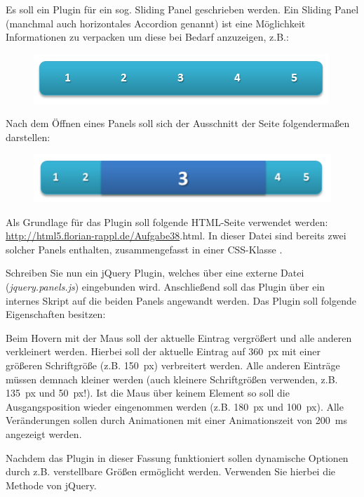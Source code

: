 %
\par Es soll ein Plugin für ein sog. Sliding Panel geschrieben werden. Ein
Sliding Panel (manchmal auch horizontales Accordion genannt) ist eine
Möglichkeit Informationen zu verpacken um diese bei Bedarf anzuzeigen, z.B.:
%
\begin{figure}[!h]
\centering
\includegraphics{Exercises/Figures/pluginclose.png}
\end{figure}
%
\par Nach dem Öffnen eines Panels soll sich der Ausschnitt der Seite
folgendermaßen darstellen:
%
\begin{figure}[!h]
\centering
\includegraphics{Exercises/Figures/pluginopen.png}
\end{figure}
%
\par Als Grundlage für das Plugin soll folgende HTML-Seite verwendet werden:
\url{http://html5.florian-rappl.de/Aufgabe38}.html. In dieser Datei sind
bereits zwei solcher Panels enthalten, zusammengefasst in einer CSS-Klasse
.
%
\par Schreiben Sie nun ein jQuery Plugin, welches über eine externe Datei
(\emph{jquery.panels.js}) eingebunden wird. Anschließend soll das Plugin über
ein internes Skript auf die beiden Panels angewandt werden. Das Plugin soll
folgende Eigenschaften besitzen:
%
\par Beim Hovern mit der Maus soll der aktuelle Eintrag vergrößert und alle
anderen verkleinert werden. Hierbei soll der aktuelle Eintrag auf \qty{360}{px}
mit einer größeren Schriftgröße (z.B. \qty{150}{px}) verbreitert werden. Alle
anderen Einträge müssen demnach kleiner werden (auch kleinere Schriftgrößen
verwenden, z.B. \qty{135}{px} und \qty{50}{px}!). Ist die Maus über keinem
Element so soll die Ausgangsposition wieder eingenommen werden (z.B.
\qty{180}{px} und \qty{100}{px}). Alle Veränderungen sollen durch Animationen
mit einer Animationszeit von \qty{200}{ms} angezeigt werden.
%
\par Nachdem das Plugin in dieser Fassung funktioniert sollen dynamische
Optionen durch z.B. verstellbare Größen ermöglicht werden. Verwenden Sie
hierbei die  Methode von jQuery.